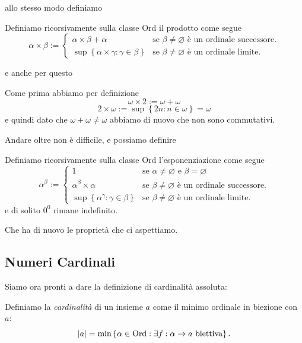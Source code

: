 \documentclass[11pt]{scrartcl}
\newcommand{\eset}{\varnothing}
\begin{document}
 	allo stesso modo definiamo
 	\begin{definition}
 		Definiamo ricorsivamente sulla classe $\text{Ord}$ il prodotto come segue
 		$$
 		\alpha \times \beta:=
 		\begin{cases}
 			\alpha\times \beta + \alpha & \text{se $\beta\ne \eset$ è un ordinale successore.}\\
 			\sup\left\{\alpha \times \gamma: \gamma\in \beta\right\} & \text{se $\beta\ne \eset$ è un ordinale limite.}
 		\end{cases}
 		$$
 	\end{definition}
 	e anche per questo
 	\begin{example}
 		Come prima abbiamo per definizione
 		$$\omega\times 2:=\omega+\omega$$
 		$$2\times \omega:=\sup\left\{2n:n\in \omega\right\}=\omega$$
 		e quindi dato che $\omega+\omega\ne \omega$ abbiamo di nuovo che non sono commutativi.
 	\end{example}
 	Andare oltre non è difficile, e possiamo definire 
 	\begin{definition}
 		Definiamo ricorsivamente sulla classe $\text{Ord}$ l'esponenziazione come segue
 		$$
 		\alpha^\beta:=
 		\begin{cases}
 			1 & \text{se $\alpha\ne \eset$ e $\beta=\eset$} \\
 			\alpha^\beta \times \alpha & \text{se $\beta\ne \eset$ è un ordinale successore.}\\
 			\sup\left\{\alpha^\gamma: \gamma\in \beta\right\} & \text{se $\beta\ne \eset$ è un ordinale limite.}
 		\end{cases}
 		$$
 		e di solito $0^0$ rimane indefinito.
 	\end{definition}
 	Che ha di nuovo le proprietà che ci aspettiamo.
 	
 	\newpage
 	
 	\subsection{Numeri Cardinali}
 	
 	Siamo ora pronti a dare la definizione di cardinalità assoluta:
 	\begin{definition}
 		Definiamo la \textit{cardinalità} di un insieme $a$ come il minimo ordinale in biezione con $a$:
 		$$\left\lvert a \right\rvert=\min\left\{\alpha\in \text{Ord}:\exists f:\alpha \to a \text{ biettiva}\right\}.$$
 	\end{definition}
 	
\end{document}

